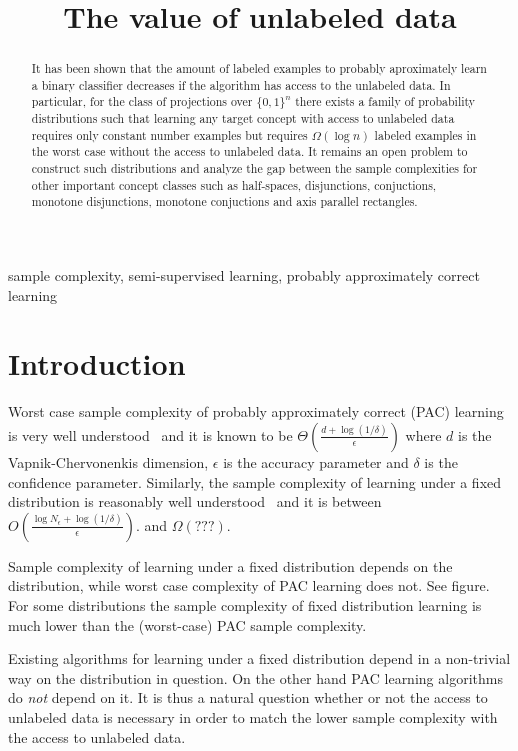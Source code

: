 \documentclass[12pt]{colt2019}
\title{The value of unlabeled data}
\begin{document}
\maketitle

\begin{abstract}
It has been shown that the amount of labeled examples to probably aproximately
learn a binary classifier decreases if the algorithm has access to the unlabeled
data. In particular, for the class of projections over $\{0,1\}^n$ there exists
a family of probability distributions such that learning any target concept with
access to unlabeled data requires only constant number examples but requires
$\Omega(\log n)$ labeled examples in the worst case without the access to
unlabeled data. It remains an open problem to construct such distributions and
analyze the gap between the sample complexities for other important concept
classes such as half-spaces, disjunctions, conjuctions, monotone disjunctions,
monotone conjuctions and axis parallel rectangles.
\end{abstract}

\begin{keywords}
sample complexity, semi-supervised learning, probably approximately correct learning
\end{keywords}

\section{Introduction}

Worst case sample complexity of probably approximately correct (PAC) learning is
very well understood~\cite{} and it is known to be $\Theta(\frac{d +
\log(1/\delta)}{\epsilon})$ where $d$ is the Vapnik-Chervonenkis dimension,
$\epsilon$ is the accuracy parameter and $\delta$ is the confidence parameter.
Similarly, the sample complexity of learning under a fixed distribution is
reasonably well understood~\cite{} and it is between $O(\frac{\log N_\epsilon +
\log(1/\delta)}{\epsilon})$. and $\Omega(???)$.

Sample complexity of learning under a fixed distribution depends on the
distribution, while worst case complexity of PAC learning does not. See figure.
For some distributions the sample complexity of fixed distribution learning is
much lower than the (worst-case) PAC sample complexity.


Existing algorithms for learning under a fixed distribution depend in a
non-trivial way on the distribution in question. On the other hand PAC learning
algorithms do \emph{not} depend on it. It is thus a natural question whether or
not the access to unlabeled data is necessary in order to match the lower sample
complexity with the access to unlabeled data.
\end{document}
